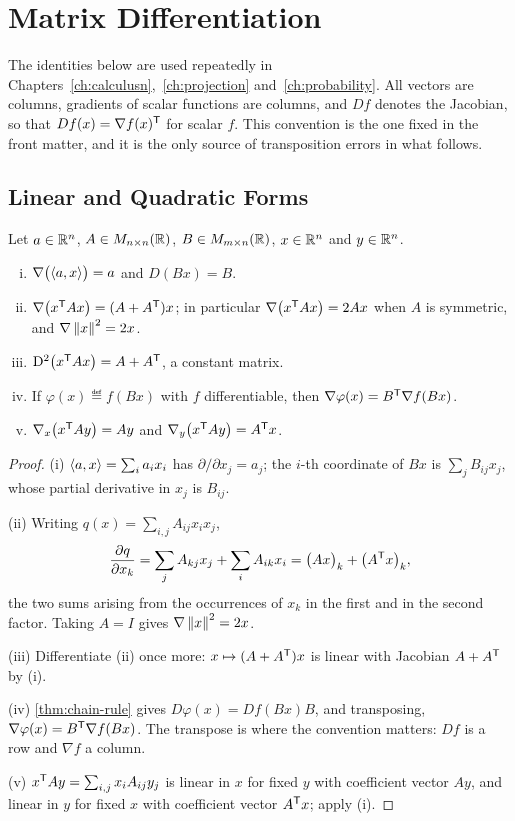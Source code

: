 \chapter{Matrix Differentiation}\label{app:matrix-calculus}

The identities below are used repeatedly in
Chapters~\ref{ch:calculusn},~\ref{ch:projection} and~\ref{ch:probability}. All
vectors are columns, gradients of scalar functions are columns, and $Df$ denotes
the Jacobian, so that $Df(x)=\nabla f(x)^{\mathsf{T}}$ for scalar $f$. This
convention is the one fixed in the front matter, and it is the only source of
transposition errors in what follows.

\section{Linear and Quadratic Forms}\label{sec:app-quadratic}

\begin{proposition}\label{prop:matrix-derivatives}
	Let $a\in\mathbb{R}^{n}$, $A\in M_{n\times n}(\mathbb{R})$, $B\in M_{m\times n}(\mathbb{R})$,
	$x\in\mathbb{R}^{n}$ and $y\in\mathbb{R}^{n}$.
	\begin{enumerate}[(i)]
		\item $\nabla\bigl(\left\langle a,x\right\rangle\bigr)=a$ and $D(Bx)=B$.
		\item $\nabla\bigl(x^{\mathsf{T}}Ax\bigr)=(A+A^{\mathsf{T}})x$; in particular
		      $\nabla\bigl(x^{\mathsf{T}}Ax\bigr)=2Ax$ when $A$ is symmetric, and
		      $\nabla\left\lVert x\right\rVert^{2}=2x$.
		\item $\operatorname{D^2}\bigl(x^{\mathsf{T}}Ax\bigr)=A+A^{\mathsf{T}}$, a constant matrix.
		\item If $\varphi(x)\eqdef f(Bx)$ with $f$ differentiable, then
		      $\nabla\varphi(x)=B^{\mathsf{T}}\nabla f(Bx)$.
		\item $\nabla_x\bigl(x^{\mathsf{T}}Ay\bigr)=Ay$ and
		      $\nabla_y\bigl(x^{\mathsf{T}}Ay\bigr)=A^{\mathsf{T}}x$.
	\end{enumerate}
\end{proposition}

\begin{proof}
	(i) $\left\langle a,x\right\rangle=\sum_ia_ix_i$ has $\partial/\partial x_j=a_j$; the $i$-th
	coordinate of $Bx$ is $\sum_jB_{ij}x_j$, whose partial derivative in $x_j$ is
	$B_{ij}$.

	(ii) Writing $q(x)=\sum_{i,j}A_{ij}x_ix_j$,
	\[
		\frac{\partial q}{\partial x_k}=\sum_{j}A_{kj}x_j+\sum_{i}A_{ik}x_i
		=\bigl(Ax\bigr)_k+\bigl(A^{\mathsf{T}}x\bigr)_k,
	\]
	the two sums arising from the occurrences of $x_k$ in the first and in the
	second factor. Taking $A=I$ gives $\nabla\left\lVert x\right\rVert^{2}=2x$.

	(iii) Differentiate (ii) once more: $x\mapsto(A+A^{\mathsf{T}})x$ is linear with
	Jacobian $A+A^{\mathsf{T}}$ by (i).

	(iv) \autoref{thm:chain-rule} gives $D\varphi(x)=Df(Bx)B$, and transposing,
	$\nabla\varphi(x)=B^{\mathsf{T}}\nabla f(Bx)$. The transpose is where the
	convention matters: $Df$ is a row and $\nabla f$ a column.

	(v) $x^{\mathsf{T}}Ay=\sum_{i,j}x_iA_{ij}y_j$ is linear in $x$ for fixed $y$ with
	coefficient vector $Ay$, and linear in $y$ for fixed $x$ with coefficient
	vector $A^{\mathsf{T}}x$; apply (i).
\end{proof}

